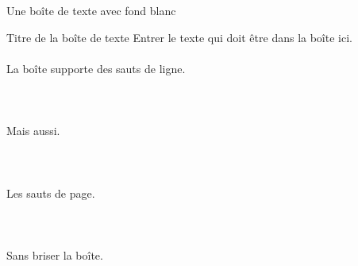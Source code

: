 Une boîte de texte avec fond blanc

\begin{textbox_blanc}{Titre de la boîte de texte}
    Entrer le texte qui doit être dans la boîte ici.
    \\
    \\
    La boîte supporte des sauts de ligne.
    \\
    \\
    \\
    \\
    Mais aussi.
    \\
    \\
    \\
    \\
    Les sauts de page.
    \\
    \\
    \\
    \\
    Sans briser la boîte.
\end{textbox_blanc}